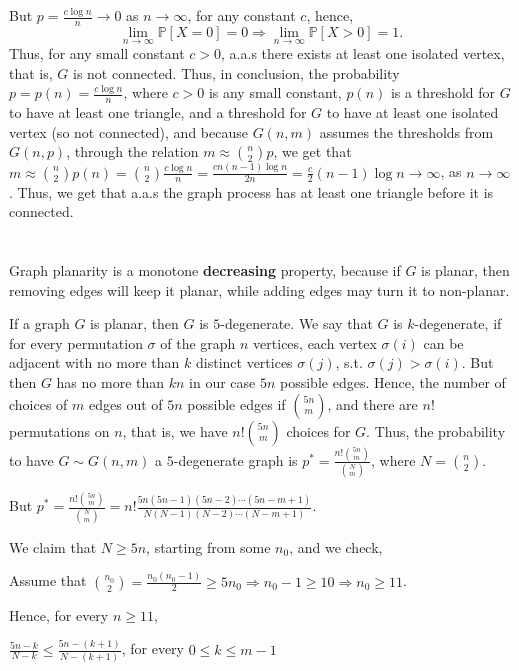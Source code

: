 \documentclass{article}
\begin{document}
But $p=\frac{c\log{n}}{n}\rightarrow{0}$ as $n\rightarrow\infty$, for any constant $c$, hence, 
\[\lim_{n\rightarrow\infty}\mathbb{P}[X=0]=0\Rightarrow\lim_{n\rightarrow\infty}\mathbb{P}[X>0]=1.\]
Thus, for any small constant $c>0$, a.a.s there exists at least one isolated vertex, that is, $G$ is not connected.
Thus, in conclusion, the probability $p=p(n)=\frac{c\log{n}}{n}$, where $c>0$ is any small constant, $p(n)$ is a threshold for $G$ to have at least one triangle, and a threshold for $G$ to have at least one isolated vertex (so not connected), and because $G(n,m)$ assumes the thresholds from $G(n,p)$, through the relation $m\approx\binom{n}{2}p$, we get that $m\approx\binom{n}{2}p(n)=\binom{n}{2}\frac{c\log{n}}{n}=\frac{cn(n-1)\log{n}}{2n}=\frac{c}{2}(n-1)\log{n}\rightarrow\infty$, as $n\rightarrow\infty$.
Thus, we get that a.a.s the graph process has at least one triangle before it is connected.
\section{}
Graph planarity is a monotone \textbf{decreasing} property, because if $G$ is planar, then removing edges will keep it planar, while adding edges may turn it to non-planar.

If a graph $G$ is planar, then $G$ is $5$-degenerate. We say that $G$ is $k$-degenerate, if for every permutation $\sigma$ of the graph $n$ vertices, each vertex $\sigma(i)$ can be adjacent with no more than $k$ distinct vertices $\sigma(j)$, s.t. $\sigma(j)>\sigma(i)$. But then $G$ has no more than $kn$ in our case $5n$ possible edges. Hence, the number of choices of $m$ edges out of $5n$ possible edges if $\binom{5n}{m}$, and there are $n!$ permutations on $n$, that is, we have $n!\binom{5n}{m}$ choices for $G$. Thus, the probability to have $G\sim{G(n,m)}$ a $5$-degenerate graph is $p^\ast=\frac{n!\binom{5n}{m}}{\binom{N}{m}}$, where $N=\binom{n}{2}$.

But $p^\ast=\frac{n!\binom{5n}{m}}{\binom{N}{m}}=n!\frac{5n(5n-1)(5n-2)\cdots(5n-m+1)}{N(N-1)(N-2)\cdots(N-m+1)}$.

We claim that $N\geq5n$, starting from some $n_0$, and we check,

Assume that $\binom{n_0}{2}=\frac{n_0(n_0-1)}{2}\geq5n_0\Rightarrow{n_0-1\geq10\Rightarrow{n_0\geq11}}$.

Hence, for every $n\geq11$,

$\frac{5n-k}{N-k}\leq\frac{5n-(k+1)}{N-(k+1)}$, for every $0\leq{k}\leq{m-1}$ 
\end{document}
